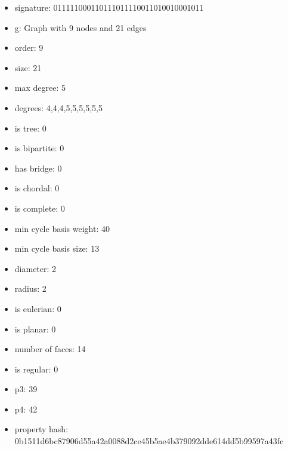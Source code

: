 \newpage
\begin{figure}
\end{figure}
\begin{itemize}
\item signature: 011111000110111011110011010010001011
\item g: Graph with 9 nodes and 21 edges
\item order: 9
\item size: 21
\item max degree: 5
\item degrees: 4,4,4,5,5,5,5,5,5
\item is tree: 0
\item is bipartite: 0
\item has bridge: 0
\item is chordal: 0
\item is complete: 0
\item min cycle basis weight: 40
\item min cycle basis size: 13
\item diameter: 2
\item radius: 2
\item is eulerian: 0
\item is planar: 0
\item number of faces: 14
\item is regular: 0
\item p3: 39
\item p4: 42
\item property hash: 0b1511d6bc87906d55a42a0088d2ce45b5ae4b379092dde614dd5b99597a43fc
\end{itemize}
